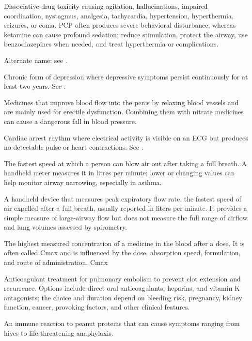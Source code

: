  Dissociative-drug toxicity causing agitation, hallucinations, impaired coordination, nystagmus, analgesia, tachycardia, hypertension, hyperthermia, seizures, or coma. PCP often produces severe behavioral disturbance, whereas ketamine can cause profound sedation; reduce stimulation, protect the airway, use benzodiazepines when needed, and treat hyperthermia or complications.

 Alternate name; see .

 Chronic form of depression where depressive symptoms persist continuously for at least two years. See .

 Medicines that improve blood flow into the penis by relaxing blood vessels and are mainly used for erectile dysfunction. Combining them with nitrate medicines can cause a dangerous fall in blood pressure.

 Cardiac arrest rhythm where electrical activity is visible on an ECG but produces no detectable pulse or heart contractions. See .

 The fastest speed at which a person can blow air out after taking a full breath. A handheld meter measures it in litres per minute; lower or changing values can help monitor airway narrowing, especially in asthma.

 A handheld device that measures peak expiratory flow rate, the fastest speed of air expelled after a full breath, usually reported in liters per minute. It provides a simple measure of large-airway flow but does not measure the full range of airflow and lung volumes assessed by spirometry.

 The highest measured concentration of a medicine in the blood after a dose. It is often called Cmax and is influenced by the dose, absorption speed, formulation, and route of administration.
\synonyms
Cmax

 Anticoagulant treatment for pulmonary embolism to prevent clot extension and recurrence. Options
include direct oral anticoagulants, heparins, and vitamin K antagonists; the choice and
duration depend on bleeding risk, pregnancy, kidney function, cancer, provoking factors,
and other clinical features.

 An immune reaction to peanut proteins that can cause symptoms ranging from hives to life-threatening anaphylaxis.

